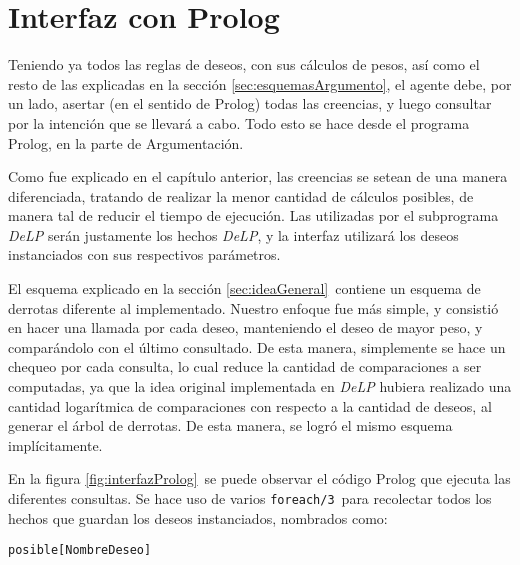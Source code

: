 \documentclass[oneside]{book}
\begin{document}
\section{Interfaz con Prolog}

\label{sec:interfazConProlog}

Teniendo ya todos las reglas de deseos, con sus cálculos de pesos, así como el resto 
de las explicadas en la sección \ref{sec:esquemasArgumento}, el agente debe, por un 
lado, asertar (en el sentido de Prolog) todas las creencias, y luego consultar por 
la intención que se llevará a cabo. Todo esto se hace desde el programa Prolog, en
la parte de Argumentación.

Como fue explicado en el capítulo anterior, %
las creencias se setean de una manera diferenciada, tratando de realizar la menor
cantidad de cálculos posibles, de manera tal de reducir el tiempo de ejecución. Las
utilizadas por el subprograma \textit{DeLP} serán justamente los hechos \textit{DeLP}, 
y la interfaz utilizará los deseos instanciados con sus respectivos parámetros.

El esquema explicado en la sección \ref {sec:ideaGeneral}\ contiene un esquema de 
derrotas diferente al implementado. Nuestro enfoque fue más simple, y consistió en 
hacer una llamada por cada deseo, manteniendo el deseo de mayor peso, y comparándolo 
con el último consultado. De esta manera, simplemente se hace un chequeo por cada 
consulta, lo cual reduce la cantidad de comparaciones a ser computadas, ya que la idea 
original implementada en \textit{DeLP} hubiera realizado una cantidad logarítmica de 
comparaciones con respecto a la cantidad de deseos, al generar el árbol de derrotas. De 
esta manera, se logró el mismo esquema implícitamente.

En la figura \ref{fig:interfazProlog}\ se puede observar el código Prolog que 
ejecuta las diferentes consultas. Se hace uso de varios \texttt{foreach/3}\ para 
recolectar todos los hechos que guardan los deseos instanciados, nombrados como:

\begin{verbatim}
posible[NombreDeseo]
\end{verbatim}
\end{document}
